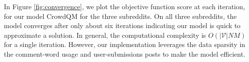 In Figure \ref{fig:convergence}, we plot the objective function score at each iteration, for our model CrowdQM for the three subreddits. On all three subreddits, the model converges after only about six iterations indicating our model is quick to approximate a solution. In general, the computational complexity is $O(\vert \mathcal{V} \vert N M)$ for a single iteration. However, our implementation leverages the data sparsity in the comment-word usage and user-submissions posts to make the model efficient.
